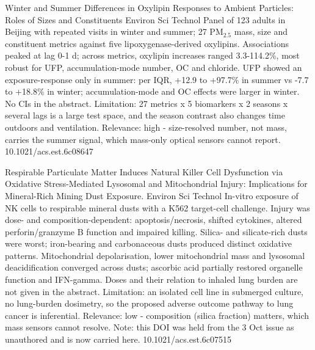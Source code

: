 \documentclass[10pt]{article}
\begin{document}
\par{}\baselineskip{}\baselineskip
{}

{Winter and Summer Differences in Oxylipin Responses to Ambient Particles: Roles of Sizes and Constituents}
{Environ Sci Technol}
{Panel of 123 adults in Beijing with repeated visits in winter and summer; 27 PM$_{2.5}$ mass, size and constituent metrics against five lipoxygenase-derived oxylipins. Associations peaked at lag 0-1 d; across metrics, oxylipin increases ranged 3.3-114.2\%, most robust for UFP, accumulation-mode number, OC and chloride. UFP showed an exposure-response only in summer: per IQR, +12.9 to +97.7\% in summer vs -7.7 to +18.8\% in winter; accumulation-mode and OC effects were larger in winter. No CIs in the abstract. Limitation: 27 metrics x 5 biomarkers x 2 seasons x several lags is a large test space, and the season contrast also changes time outdoors and ventilation. Relevance: high - size-resolved number, not mass, carries the summer signal, which mass-only optical sensors cannot report.}
{10.1021/acs.est.6c08647}

{Respirable Particulate Matter Induces Natural Killer Cell Dysfunction via Oxidative Stress-Mediated Lysosomal and Mitochondrial Injury: Implications for Mineral-Rich Mining Dust Exposure.}
{Environ Sci Technol}
{In-vitro exposure of NK cells to respirable mineral dusts with a K562 target-cell challenge. Injury was dose- and composition-dependent: apoptosis/necrosis, shifted cytokines, altered perforin/granzyme B function and impaired killing. Silica- and silicate-rich dusts were worst; iron-bearing and carbonaceous dusts produced distinct oxidative patterns. Mitochondrial depolarisation, lower mitochondrial mass and lysosomal deacidification converged across dusts; ascorbic acid partially restored organelle function and IFN-gamma. Doses and their relation to inhaled lung burden are not given in the abstract. Limitation: an isolated cell line in submerged culture, no lung-burden dosimetry, so the proposed adverse outcome pathway to lung cancer is inferential. Relevance: low - composition (silica fraction) matters, which mass sensors cannot resolve. Note: this DOI was held from the 3 Oct issue as unauthored and is now carried here.}
{10.1021/acs.est.6c07515}

\par{}\baselineskip{}\baselineskip
{}
\end{document}
